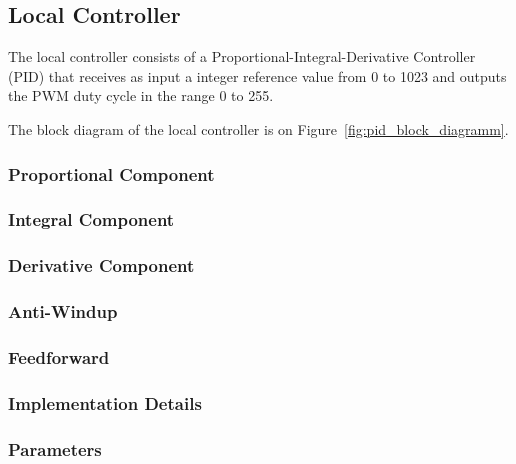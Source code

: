 

\subsection{Local Controller}
\label{sec:LocalController}

The local controller consists of a Proportional-Integral-Derivative Controller (PID) that receives as input a integer reference value from 0 to 1023 and outputs the PWM duty cycle in the range 0 to 255.

The block diagram of the local controller is on Figure~\ref{fig:pid_block_diagramm}.

\subsubsection{Proportional Component}
\label{sub:ProportionalComponent}

\subsubsection{Integral Component}
\label{sub:IntegralComponent}

\subsubsection{Derivative Component}
\label{sub:Derivative Component}

\subsubsection{Anti-Windup}
\label{sub:AntiWindup}

\subsubsection{Feedforward}
\label{sub:Feedforward}

\subsubsection{Implementation Details}
\label{sub:Implementation Details}

\subsubsection{Parameters}
\label{sub:Parameters}
